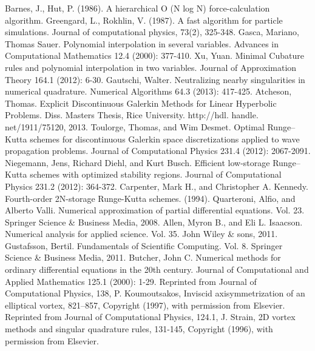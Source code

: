 \documentclass[letterpaper,12pt]{report}
\begin{document}
\begin{thebibliography}{8}
Barnes, J.,  Hut, P. (1986). A hierarchical O (N log N) force-calculation algorithm.
Greengard, L.,  Rokhlin, V. (1987). A fast algorithm for particle simulations. Journal of computational physics, 73(2), 325-348.
Gasca, Mariano, Thomas Sauer. Polynomial interpolation in several variables. Advances in Computational Mathematics 12.4 (2000): 377-410.
Xu, Yuan. Minimal Cubature rules and polynomial interpolation in two variables. Journal of Approximation Theory 164.1 (2012): 6-30.
Gautschi, Walter. Neutralizing nearby singularities in numerical quadrature. Numerical Algorithms 64.3 (2013): 417-425.
Atcheson, Thomas. Explicit Discontinuous Galerkin Methods for Linear Hyperbolic Problems. Diss. Masters Thesis, Rice University. http://hdl. handle. net/1911/75120, 2013.
Toulorge, Thomas, and Wim Desmet. Optimal Runge–Kutta schemes for discontinuous Galerkin space discretizations applied to wave propagation problems. Journal of Computational Physics 231.4 (2012): 2067-2091.
Niegemann, Jens, Richard Diehl, and Kurt Busch. Efficient low-storage Runge–Kutta schemes with optimized stability regions. Journal of Computational Physics 231.2 (2012): 364-372.
Carpenter, Mark H., and Christopher A. Kennedy. Fourth-order 2N-storage Runge-Kutta schemes. (1994).
Quarteroni, Alfio, and Alberto Valli. Numerical approximation of partial differential equations. Vol. 23. Springer Science \& Business Media, 2008.
Allen, Myron B., and Eli L. Isaacson. Numerical analysis for applied science. Vol. 35. John Wiley \& sons, 2011.
Gustafsson, Bertil. Fundamentals of Scientific Computing. Vol. 8. Springer Science \& Business Media, 2011.
Butcher, John C. Numerical methods for ordinary differential equations in the 20th century. Journal of Computational and Applied Mathematics 125.1 (2000): 1-29.
Reprinted from  Journal of Computational Physics, 138, P. Koumoutsakos, Inviscid axisymmetrization of an elliptical vortex, 821–857, Copyright (1997), with permission from Elsevier.
Reprinted from Journal of Computational Physics, 124.1, J. Strain, 2D vortex methods and singular quadrature rules, 131-145, Copyright (1996), with permission from Elsevier.


\end{thebibliography}
\cleardoublepage
\appendix
{}
%
\end{document}
